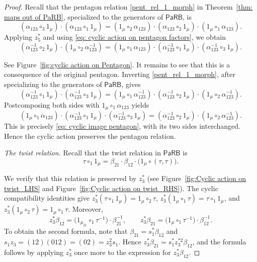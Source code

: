 \documentclass{amsart}
\newcommand{\PaRB}{\mathsf{PaRB}}
\newcommand{\twist}{\tau}
\theoremstyle{definition}
\numberwithin{equation}{section}
\begin{document}
\begin{proof}
Recall that the pentagon relation \eqref{pent_rel_1_morph} in Theorem~\ref{thm: maps out of PaRB}, specialized to the generators of
$\PaRB$, is
\[ (\alpha_{123}\circ_3 1_\mu) \cdot(\alpha_{123}\circ_1 1_\mu) = (1_\mu\circ_2\alpha_{123})
\cdot(\alpha_{123}\circ_2 1_\mu) \cdot(1_\mu\circ_1\alpha_{123}). \] Applying $z_5^*$ and using
\eqref{eq: cyclic action on pentagon factors}, we obtain
\begin{equation}
\label{eq: cyclic image pentagon}
(\alpha_{123}^{-1}\circ_2 1_\mu) \cdot(1_\mu\circ_2\alpha_{123}^{-1}) = (1_\mu\circ_1\alpha_{123}) \cdot(\alpha_{123}^{-1}\circ_1 1_\mu) \cdot(\alpha_{123}^{-1}\circ_3 1_\mu). 
\end{equation}

See Figure~\ref{fig:cyclic action on Pentagon}. It remains to see that this is a consequence of the original pentagon. Inverting \eqref{pent_rel_1_morph}, after specializing to the generators of $\PaRB$, gives
\[
(\alpha_{123}^{-1}\circ_1 1_\mu) \cdot(\alpha_{123}^{-1}\circ_3 1_\mu) = (1_\mu\circ_1\alpha_{123}^{-1}) \cdot(\alpha_{123}^{-1}\circ_2 1_\mu) \cdot(1_\mu\circ_2\alpha_{123}^{-1}).\] Postcomposing both sides with $1_\mu\circ_1\alpha_{123}$ yields
\[
(1_\mu\circ_1\alpha_{123})
\cdot(\alpha_{123}^{-1}\circ_1 1_\mu)
\cdot(\alpha_{123}^{-1}\circ_3 1_\mu)
=
(\alpha_{123}^{-1}\circ_2 1_\mu)
\cdot(1_\mu\circ_2\alpha_{123}^{-1}).
\]
This is precisely \eqref{eq: cyclic image pentagon}, with its two sides interchanged. Hence the cyclic action preserves the pentagon relation.

\smallskip
\noindent\emph{The twist relation.}
Recall that the twist relation in $\PaRB$ is
\begin{equation}
\label{eq: twist relation PaRB proof}
\twist\circ_1 1_\mu
=
\beta_{21}\cdot\beta_{12}\cdot
\bigl(1_\mu\circ(\twist,\twist)\bigr).
\end{equation}

We verify that this relation is preserved by $z_3^*$ (see Figure~\ref{fig:Cyclic action on twist_LHS} and Figure~\ref{fig:Cyclic action on twist_RHS}). The cyclic
compatibility identities give
$z_3^*(\twist\circ_1 1_\mu)=1_\mu\circ_2\twist$,
$z_3^*(1_\mu\circ_1\twist)=\twist\circ_1 1_\mu$, and
$z_3^*(1_\mu\circ_2\twist)=1_\mu\circ_1\twist$.
Moreover,
\[
z_3^*\beta_{12}
=
\bigl(1_{\mu_{21}}\circ_1\twist^{-1}\bigr)
\cdot\beta_{21}^{-1},
\qquad
z_3^*\beta_{21}
=
\bigl(1_\mu\circ_1\twist^{-1}\bigr)
\cdot\beta_{12}^{-1}.
\]
To obtain the second formula, note that
$\beta_{21}=s_1^*\beta_{12}$ and
$s_1z_3=(12)(012)=(02)=z_3^2s_1$. Hence
$z_3^*\beta_{21}=s_1^*z_3^{*2}\beta_{12}$, and the formula follows
by applying $z_3^*$ once more to the expression for
$z_3^*\beta_{12}$.


\end{proof}
\end{document}
